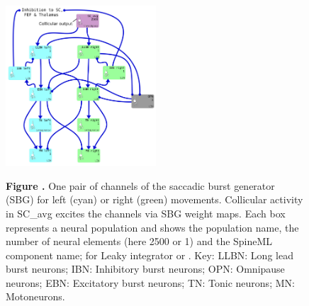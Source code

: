 \documentclass{frontiersSCNS}
\begin{document}
\begin{figure}[htb!]
\begin{center}
\includegraphics[width=0.5\textwidth]{./figures/Brain_Stem_1channel.png}
\end{center}
\textbf{\label{sbg} Figure .}
{ One pair of channels of the saccadic burst generator (SBG) for left
(cyan) or right (green) movements. Collicular activity in SC\_avg
excites the channels via SBG weight maps. Each box represents a neural
population and shows the population name, the number of neural
elements (here 2500 or 1) and the SpineML component name;  for
Leaky integrator or . Key: LLBN: Long lead burst
neurons; IBN: Inhibitory burst neurons; OPN: Omnipause neurons; EBN:
Excitatory burst neurons; TN: Tonic neurons; MN: Motoneurons.}
\end{figure}
\end{document}
